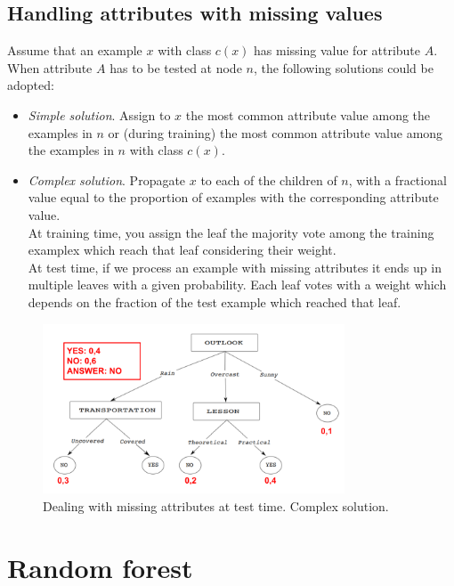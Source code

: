 \subsection{Handling attributes with missing values}
Assume that an example $x$ with class $c(x)$ has missing value for attribute $A$. When attribute $A$ has to be tested at node $n$, the following solutions could be adopted:
\begin{itemize}
    \item \textit{Simple solution}. Assign to $x$ the most common attribute value among the examples in $n$ or (during training) the most common attribute value among the examples in $n$ with class $c(x)$.
    \item \textit{Complex solution}. Propagate $x$ to each of the children of $n$, with a fractional value equal to the proportion of examples with the corresponding attribute value.\\At training time, you assign the leaf the majority vote among the training examplex which reach that leaf considering their weight.\\At test time, if we process an example with missing attributes it ends up in multiple leaves with a given probability. Each leaf votes with a weight which depends on the fraction of the test example which reached that leaf.
\end{itemize}

\begin{figure}
    \centering
    \includegraphics[width=0.8\textwidth]{images/missingAttributes.png}
    \caption{Dealing with missing attributes at test time. Complex solution.}
    \label{missing_attributes}
\end{figure}

\section{Random forest}

